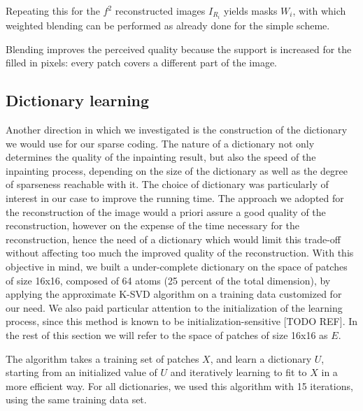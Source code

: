 Repeating this for the $f^2$ reconstructed images $I_{R_i}$ yields masks $W_i$, with which weighted blending can be performed as already done for the simple scheme.

Blending improves the perceived quality because the support is increased for the filled in pixels: every patch covers a different part of the image.



\subsection{Dictionary learning}

Another direction in which we investigated is the construction of the dictionary we would use for our sparse coding. The nature of a dictionary not only determines the quality of the inpainting result, but also the speed of the inpainting process, depending on the size of the dictionary as well as the degree of sparseness reachable with it. 
The choice of dictionary was particularly of interest in our case to improve the running time. The approach we adopted for the reconstruction of the image would a priori assure a good quality of the reconstruction, however on the expense of the time necessary for the reconstruction, hence the need of a dictionary which would limit this trade-off without affecting too much the improved quality of the reconstruction.
With this objective in mind, we built a under-complete dictionary on the space of patches of size 16x16, composed of 64 atoms (25 percent of the total dimension), by applying the approximate K-SVD algorithm on a training data customized for our need. We also paid particular attention to the initialization of the learning process, since this method is known to be initialization-sensitive [TODO REF]. In the rest of this section we will refer to the space of patches of size 16x16 as $E$.

The algorithm takes a training set of patches $X$, and learn a dictionary $U$, starting from an initialized value of $U$ and iteratively learning to fit to $X$ in a more efficient way. 
For all dictionaries, we used this algorithm with 15 iterations, using the same training data set.

